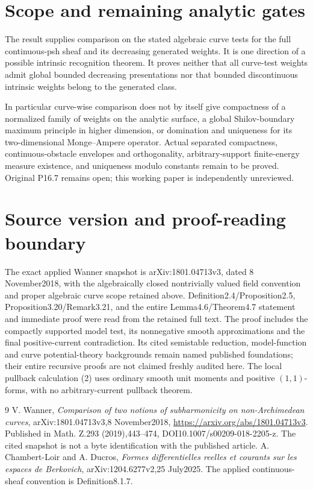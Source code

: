 \documentclass[11pt]{article}
\begin{document}
\section{Scope and remaining analytic gates}
The result supplies comparison on the stated algebraic curve tests for
the full continuous-psh sheaf and its decreasing generated weights.
It is one direction of a possible intrinsic recognition theorem.
It proves neither that all curve-test weights admit global bounded
decreasing presentations nor that bounded discontinuous intrinsic
weights belong to the generated class.

In particular curve-wise comparison does not by itself give compactness
of a normalized family of weights on the analytic surface, a global
Shilov-boundary maximum principle in higher dimension, or domination
and uniqueness for its two-dimensional Monge--Ampere operator.
Actual separated compactness, continuous-obstacle envelopes and
orthogonality, arbitrary-support finite-energy measure existence, and
uniqueness modulo constants remain to be proved. Original P16.7 remains
open; this working paper is independently unreviewed.

\section{Source version and proof-reading boundary}
The exact applied Wanner snapshot is arXiv:1801.04713v3, dated
8 November2018, with the algebraically closed nontrivially valued field
convention and proper algebraic curve scope retained above.
Definition2.4/Proposition2.5, Proposition3.20/Remark3.21, and the entire
Lemma4.6/Theorem4.7 statement and immediate proof were read from the
retained full text. The proof includes the compactly supported model test,
its nonnegative smooth approximations and the final positive-current
contradiction. Its cited semistable reduction, model-function and curve
potential-theory backgrounds remain named published foundations; their
entire recursive proofs are not claimed freshly audited here.
The local pullback calculation (2) uses ordinary smooth unit moments
and positive $(1,1)$-forms, with no arbitrary-current pullback theorem.

\begin{thebibliography}{9}
 V. Wanner,
\emph{Comparison of two notions of subharmonicity on non-Archimedean
curves}, arXiv:1801.04713v3,8 November2018,
\url{https://arxiv.org/abs/1801.04713v3}.
Published in Math. Z.293 (2019),443--474,
DOI10.1007/s00209-018-2205-z. The cited snapshot is not a byte
identification with the published article.
 A. Chambert-Loir and A. Ducros,
\emph{Formes differentielles reelles et courants sur les espaces de
Berkovich}, arXiv:1204.6277v2,25 July2025.
The applied continuous-sheaf convention is Definition8.1.7.
\end{thebibliography}
\end{document}
